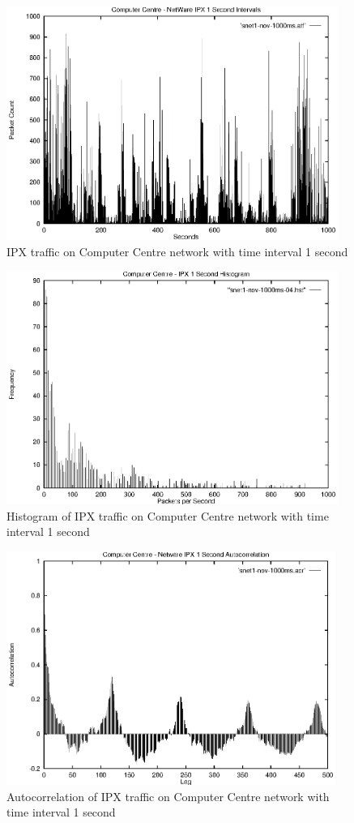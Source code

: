\begin{figure}
\includegraphics[height=3in]{pics/snet1-ipx-1s-freq.eps}
\caption{IPX traffic on Computer Centre network with time interval 1 second}
\label{results:snet1.nov.1s.freq}
\end{figure}

\begin{figure}
\includegraphics[height=3in]{pics/snet1-ipx-1s-hist-02.eps}
\caption{Histogram of IPX traffic on Computer Centre network with time interval 1 second}
\label{results:snet1.nov.1s.hist}
\end{figure}

\begin{figure}
\includegraphics[height=3in]{pics/snet1-ipx-1s-acr.eps}
\caption{Autocorrelation of IPX traffic on Computer Centre network with time interval 1 second}
\label{results:snet1.nov.1s.acr}
\end{figure}


